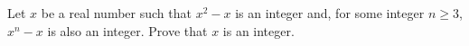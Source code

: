 Let $x$ be a real number such that $x^2-x$ is an integer and, for some integer $n\ge3$, $x^n-x$ is also an integer. Prove that $x$ is an integer.

